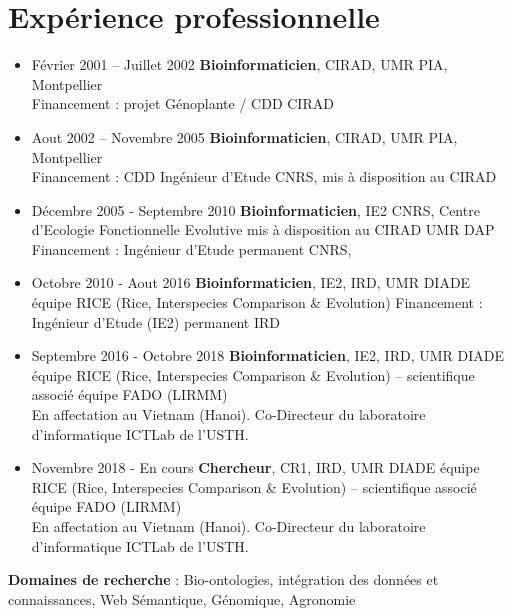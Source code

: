 \section{Expérience professionnelle}
\begin{itemize}
\item Février 2001 – Juillet 2002  \textbf{Bioinformaticien}, CIRAD, UMR PIA, Montpellier \\
Financement : projet Génoplante / CDD CIRAD	
\item Aout 2002 – Novembre 2005 \textbf{Bioinformaticien}, CIRAD, UMR PIA, Montpellier \\
Financement : CDD Ingénieur d’Etude CNRS, mis à disposition au CIRAD 
\item Décembre 2005 - Septembre 2010 \textbf{Bioinformaticien}, IE2 CNRS, Centre d’Ecologie Fonctionnelle Evolutive mis à disposition au CIRAD UMR DAP \\
Financement : Ingénieur d’Etude permanent CNRS, 
\item Octobre 2010 - Aout 2016 \textbf{Bioinformaticien}, IE2, IRD, UMR DIADE équipe RICE (Rice, Interspecies Comparison \& Evolution)
Financement : Ingénieur d’Etude (IE2) permanent IRD
\item Septembre 2016 - Octobre 2018 \textbf{Bioinformaticien}, IE2, IRD, UMR DIADE équipe RICE (Rice, Interspecies Comparison \& Evolution) – scientifique associé équipe FADO (LIRMM)\\
En affectation au Vietnam (Hanoi). Co-Directeur du laboratoire d’informatique ICTLab de l’USTH.
\item Novembre 2018 - En cours \textbf{Chercheur}, CR1, IRD, UMR DIADE équipe RICE (Rice, Interspecies Comparison \& Evolution) – scientifique associé équipe FADO (LIRMM)\\
En affectation au Vietnam (Hanoi). Co-Directeur du laboratoire d’informatique ICTLab de l’USTH.

\end{itemize}

\vspace{1cm}
\textbf{Domaines de recherche} : 	Bio-ontologies, intégration des données et connaissances, Web Sémantique, Génomique, Agronomie
